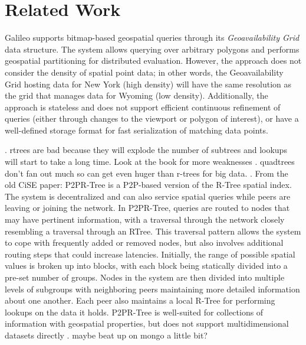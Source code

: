\section{Related Work}


Galileo \cite{malensek2013polygon,malensek2014evaluating,malensek2016autonomous} supports bitmap-based geospatial queries through its \emph{Geoavailability Grid} data structure. The system allows querying over arbitrary polygons and performs geospatial partitioning for distributed evaluation.  However, the approach does not consider the density of spatial point data; in other words, the Geoavailability Grid hosting data for New York (high density) will have the same resolution as the grid that manages data for Wyoming (low density). Additionally, the approach is stateless and does not support efficient continuous refinement of queries (either through changes to the viewport or polygon of interest), or have a well-defined storage format for fast serialization of matching data points.

. rtrees are bad because they will explode the number of subtrees and lookups will start to take a long time. Look at the book for more weaknesses
. quadtrees don't fan out much so can get even huger than r-trees for big data. 
. From the old CiSE paper: P2PR-Tree \cite{} is a P2P-based version of the R-Tree spatial index. The system is decentralized and can also service
spatial queries while peers are leaving or joining the network. In P2PR-Tree, queries are routed to nodes that may
have pertinent information, with a traversal through the network closely resembling a traversal through an RTree. This traversal pattern allows the system to cope with frequently added or removed nodes, but also involves
additional routing steps that could increase latencies. Initially, the range of possible spatial values is broken up
into blocks, with each block being statically divided into a pre-set number of groups. Nodes in the system are then
divided into multiple levels of subgroups with neighboring peers maintaining more detailed information about one
another. Each peer also maintains a local R-Tree for performing lookups on the data it holds. P2PR-Tree is well-suited for collections of information with geospatial properties, but does not support multidimensional datasets
directly
. maybe beat up on mongo a little bit?
